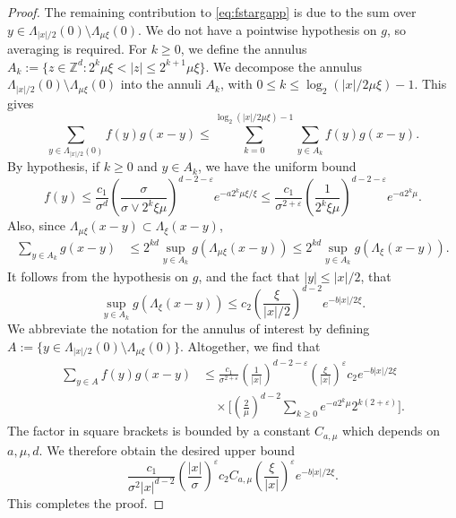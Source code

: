 \documentclass[11pt,a4paper]{article}
\numberwithin{equation}{section}
\theoremstyle{plain}
\theoremstyle{definition}
\newcommand\1{\mathds{1}}
\begin{document}
\begin{proof}
The remaining contribution to \eqref{eq:fstargapp} is due to the sum over $y \in \Lambda_{|x|/2}(0)
\setminus \Lambda_{\mu\xi}(0)$.
We do not have a
pointwise hypothesis on $g$, so averaging is required.
For $k \ge 0$, we define the annulus $A_k:= \{z\in \mathbb Z^d: 2^{k} \mu \xi < |z| \le  2^{k+1}\mu\xi\}$. We decompose the annulus
$\Lambda_{|x|/2}(0) \setminus \Lambda_{\mu \xi }(0)$
into the annuli $A_k$, with $0 \le k \le \log_2(|x|/2\mu \xi)-1$.
This gives
\begin{equation}
    \sum_{y \in \Lambda_{|x|/2}(0)} f(y)g(x-y)
    \le
    \sum_{k=0}^{\log_2(|x|/2 \mu\xi)-1}\sum_{y\in A_k }
    f(y)g(x-y).
\end{equation}
By hypothesis, if $k\geq 0$ and $y \in A_k$, we have the uniform bound
\begin{equation}
    f(y)
    \le
    \frac{c_1}{\sigma^d}
    \left(\frac{\sigma}{\sigma \vee 2^{k} \xi \mu}\right)^{d-2-\varepsilon} e^{-a 2^{k} \mu\xi/\xi}  \le  \frac{c_1}{\sigma^{2+\varepsilon}}
    \left(\frac{1}{ 2^{k} \xi \mu}\right)^{d-2-\varepsilon}
    e^{-a 2^{k} \mu} .
\end{equation}
Also, since $\Lambda_{\mu \xi}(x-y)\subset \Lambda_{ \xi}(x-y)$,
\begin{align}
    \sum_{y\in A_k }g(x-y)
    & \le
    2^{kd} \sup_{y\in A_k}g(\Lambda_{\mu \xi}(x-y))
    \le
    2^{kd} \sup_{y\in A_k}g(\Lambda_{\xi}(x-y)).
\end{align}
It follows from
the hypothesis on $g$, and the fact that $|y|\le |x|/2 $,
that
\begin{equation}
    \sup_{y\in A_k}g(\Lambda_{\xi}(x-y))
    \le
    c_2\left( \frac{\xi}{|x|/2}\right)^{d-2}
    e^{-b|x|/2\xi}.
\end{equation}
We abbreviate the notation for the annulus of interest
by defining $A:=\{y \in \Lambda_{|x|/2}(0)
\setminus \Lambda_{\mu\xi}(0)\}$.
Altogether, we find that
\begin{align}
    \sum_{y \in A} f(y)g(x-y)
&\le
    \frac{c_1}{\sigma^{2+\varepsilon}}
    \left(\frac{1}{|x|} \right)^{d-2-\varepsilon}
    \left(\frac{\xi}{|x|}\right)^{\varepsilon}
    c_2   e^{-b|x|/2\xi}
    \nonumber \\ & \quad \times
    \Big[\left(\frac{2}{\mu}\right)^{d-2}\sum_{k\geq 0}  e^{-a 2^k  \mu}
    2^{k(2+\varepsilon)}\Big]
    .
\end{align}
The factor in square brackets is bounded by a constant $C_{a,\mu}$ which depends on $a,\mu,d$.
We therefore obtain the desired upper bound
\begin{equation}
    \frac{c_1}{\sigma^2|x|^{d-2}}\left(\frac{|x|}{\sigma}\right)^\varepsilon c_2 C_{a,\mu}\left( \frac{\xi}{|x|}\right)^{\varepsilon} e^{-b|x|/2\xi} .
\end{equation}
This completes the proof.
\end{proof}
\end{document}
